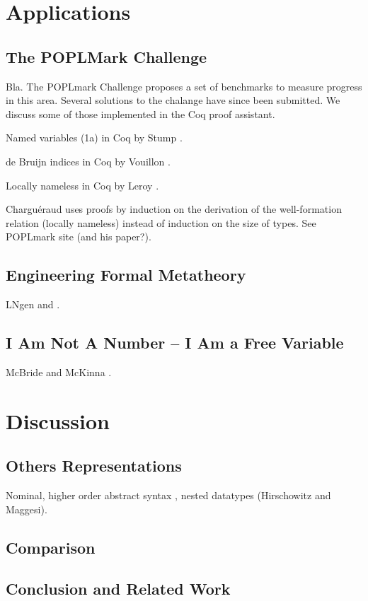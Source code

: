 \documentclass[a4paper,11pt]{article}
\begin{document}
\section{Applications}

\subsection{The POPLMark Challenge}

Bla.
The POPLmark Challenge \cite{Poplmark-Challenge-05} proposes a set of
benchmarks to measure progress in this area.
Several solutions to the chalange have since been submitted.
We discuss some of those implemented in the Coq proof assistant.

Named variables (1a) in Coq by Stump \cite{Stump-05}.

de Bruijn indices in Coq by Vouillon \cite{Vouillon-05}.

Locally nameless in Coq by Leroy \cite{Leroy-07}.

Chargu\'eraud uses proofs by induction on the derivation of the
well-formation relation (locally nameless) instead of induction on the
size of types. See POPLmark site (and his paper?).


\subsection{Engineering Formal Metatheory}

LNgen and \cite{Aydemir-et-al-08}.


\subsection{I Am Not A Number -- I Am a Free Variable}

McBride and McKinna \cite{McBride-McKinna-04}.


\section{Discussion}\label{sec:discussion}

\subsection{Others Representations}

Nominal, higher order abstract syntax \cite{Capretta-Felty-06}, nested datatypes (Hirschowitz and Maggesi).


\subsection{Comparison}


\subsection{Conclusion and Related Work}


\nocite{*}


\end{document}
